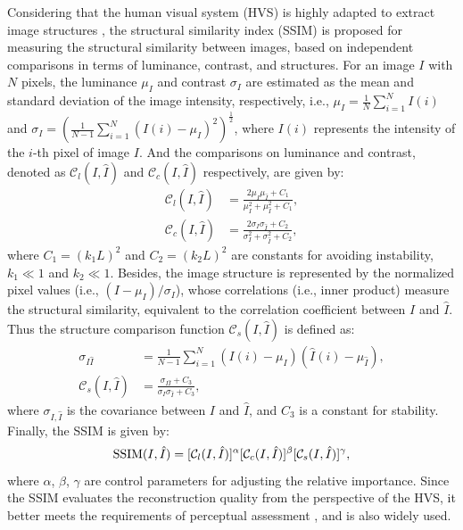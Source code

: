 \label{sec_iqa_ssim}
Considering that the human visual system (HVS) is highly adapted to extract image structures , the structural similarity index (SSIM)  is proposed for measuring the structural similarity between images, based on independent comparisons in terms of luminance, contrast, and structures.
For an image $I$ with $N$ pixels, the luminance $\mu_I$ and contrast $\sigma_I$ are estimated as the mean and standard deviation of the image intensity, respectively, i.e., $\mu_I = \frac{1}{N} \sum_{i=1}^N I(i)$ and $\sigma_I = (\frac{1}{N-1} \sum_{i=1}^N (I(i) - \mu_I)^2)^\frac{1}{2}$,
where $I(i)$ represents the intensity of the $i$-th pixel of image $I$.
And the comparisons on luminance and contrast, denoted as $\mathcal{C}_l(I, \hat{I})$ and $\mathcal{C}_c(I, \hat{I})$ respectively, are given by:
\begin{align}
    \mathcal{C}_l(I, \hat{I}) &= \frac {2 \mu_I \mu_{\hat{I}} + C_1} {\mu_I^2 + \mu_{\hat{I}}^2 + C_1}, \\
    \mathcal{C}_c(I, \hat{I}) &= \frac {2 \sigma_I \sigma_{\hat{I}} + C_2} {\sigma_I^2 + \sigma_{\hat{I}}^2 + C_2},
\end{align}
where $C_1 = (k_1 L)^2$ and $C_2 = (k_2 L)^2$ are constants for avoiding instability, $k_1 \ll 1$ and $k_2 \ll 1$.
Besides, the image structure is represented by the normalized pixel values (i.e., $(I - \mu_I) / \sigma_I$), whose correlations (i.e., inner product) measure the structural similarity, equivalent to the correlation coefficient between $I$ and $\hat{I}$.
Thus the structure comparison function $\mathcal{C}_s(I, \hat{I})$ is defined as:
\begin{align}
    \sigma_{I\hat{I}} &= \frac{1}{N-1} \sum_{i=1}^{N} (I(i) - \mu_I) (\hat{I}(i) - \mu_{\hat{I}}), \\
    \mathcal{C}_s(I, \hat{I}) &= \frac {\sigma_{I \hat{I}} + C_3} {\sigma_I \sigma_{\hat{I}} + C_3},
\end{align}
where $\sigma_{I,\hat{I}}$ is the covariance between $I$ and $\hat{I}$, and $C_3$ is a constant for stability.
Finally, the SSIM is given by:
\begin{equation}
    {\rm SSIM}(I, \hat{I}) = [\mathcal{C}_l(I, \hat{I})]^\alpha
                             [\mathcal{C}_c(I, \hat{I})]^\beta
                             [\mathcal{C}_s(I, \hat{I})]^\gamma,
\end{equation}
where $\alpha$, $\beta$, $\gamma$ are control parameters for adjusting the relative importance.
Since the SSIM evaluates the reconstruction quality from the perspective of the HVS, it better meets the requirements of perceptual assessment , and is also widely used.

